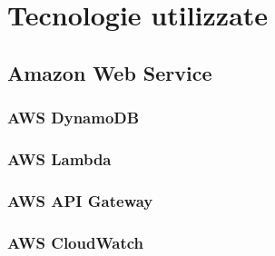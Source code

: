 \chapter{Tecnologie utilizzate}
\label{Tecnologie}
\section{Amazon Web Service}
\subsection{AWS DynamoDB}
\subsection{AWS Lambda}
\subsection{AWS API Gateway}
\subsection{AWS CloudWatch}